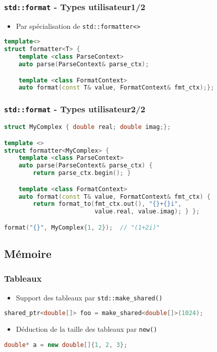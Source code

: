 \documentclass[C++.tex]{subfiles}
\begin{document}
\begin{frame}[fragile]
	\frametitle{\lstinline|std::format| - Types utilisateur\titlehfill{}1/2}
	\begin{itemize}
		\item Par spécialisation de \lstinline|std::formatter<>|
	\end{itemize}
		
	\begin{lstlisting}[language=C++]
template<>
struct formatter<T> {
	template <class ParseContext>
	auto parse(ParseContext& parse_ctx);

	template <class FormatContext>
	auto format(const T& value, FormatContext& fmt_ctx);};\end{lstlisting}
\end{frame}

\begin{frame}[fragile]
	\frametitle{\lstinline|std::format| - Types utilisateur\titlehfill{}2/2}
	\begin{lstlisting}[language=C++]
struct MyComplex { double real; double imag;};

template <>
struct formatter<MyComplex> {
	template <class ParseContext>
	auto parse(ParseContext& parse_ctx) { 
		return parse_ctx.begin(); }

	template <class FormatContext>
	auto format(const T& value, FormatContext& fmt_ctx) {
		return format_to(fmt_ctx.out(), "{}+{}i", 
		                 value.real, value.imag); } };

format("{}", MyComplex{1, 2});	// "(1+2i)"\end{lstlisting}
\end{frame}

\subsection*{Mémoire}
\begin{frame}[fragile]
	\frametitle{Tableaux}
	\begin{itemize}
		\item Support des tableaux par \lstinline|std::make_shared()|
	\end{itemize}

	\begin{lstlisting}[language=C++]
shared_ptr<double[]> foo = make_shared<double[]>(1024);\end{lstlisting}

	\begin{itemize}
		\item Déduction de la taille des tableaux par \lstinline|new()|
	\end{itemize}

	\begin{lstlisting}[language=C++]
double* a = new double[]{1, 2, 3};\end{lstlisting}
\end{frame}
\end{document}
